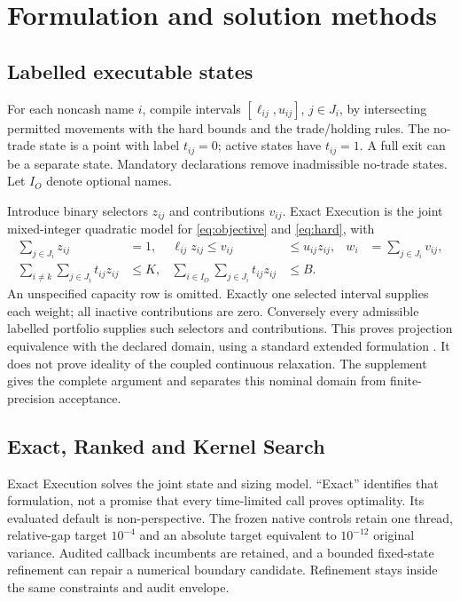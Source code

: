 \documentclass[preprint,12pt,authoryear]{elsarticle}
\begin{document}
\section{Formulation and solution methods}\label{sec:methods}
\subsection{Labelled executable states}
For each noncash name $i$, compile intervals $[\ell_{ij},u_{ij}]$, $j\in J_i$,
by intersecting permitted movements with the hard bounds and the trade/holding
rules. The no-trade state is a point with label $t_{ij}=0$; active states have
$t_{ij}=1$. A full exit can be a separate state. Mandatory declarations remove
inadmissible no-trade states. Let $I_O$ denote optional names.

Introduce binary selectors $z_{ij}$ and contributions $v_{ij}$. Exact Execution
is the joint mixed-integer quadratic model for \eqref{eq:objective} and
\eqref{eq:hard}, with
\begin{align}
 \sum_{j\in J_i}z_{ij}&=1,&
 \ell_{ij}z_{ij}\le v_{ij}&\le u_{ij}z_{ij},&
 w_i&=\sum_{j\in J_i}v_{ij},\label{eq:states}\\
 \sum_{i\ne k}\sum_{j\in J_i}t_{ij}z_{ij}&\le K,&
 \sum_{i\in I_O}\sum_{j\in J_i}t_{ij}z_{ij}&\le B.\label{eq:counts}
\end{align}
An unspecified capacity row is omitted. Exactly one selected interval supplies
each weight; all inactive contributions are zero. Conversely every admissible
labelled portfolio supplies such selectors and contributions. This proves
projection equivalence with the declared domain, using a standard extended
formulation \citep{vielma2015}. It does not prove ideality of the coupled
continuous relaxation. The supplement gives the complete argument and
separates this nominal domain from finite-precision acceptance.

\subsection{Exact, Ranked and Kernel Search}
Exact Execution solves the joint state and sizing model. ``Exact'' identifies
that formulation, not a promise that every time-limited call proves optimality.
Its evaluated default is non-perspective. The frozen native controls retain
one thread, relative-gap target $10^{-4}$ and an absolute target equivalent to
$10^{-12}$ original variance. Audited callback incumbents are retained, and a
bounded fixed-state refinement can repair a numerical boundary candidate.
Refinement stays inside the same constraints and audit envelope.
\end{document}
